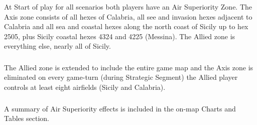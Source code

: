 \begin{enumerate}[label=\alph*.]
    \subsubsection{} At Start of play for all scenarios both players have an Air Superiority Zone. The Axis zone consists of all hexes of Calabria, all see and invasion hexes adjacent to Calabria and all sea and coastal hexes along the north coast of Sicily up to hex 2505, plus Sicily coastal hexes 4324 and 4225 (Messina). The Allied zone is everything else, nearly all of Sicily.
    \subsubsection{} The Allied zone is extended to include the entire game map and the Axis zone is eliminated on every game-turn (during Strategic Segment) the Allied player controls at least eight airfields (Sicily and Calabria).
    \subsubsection{} A summary of Air Superiority effects is included in the on-map Charts and Tables section.
\end{enumerate}